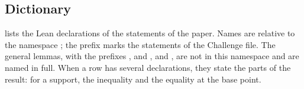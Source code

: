 \subsection{Dictionary}\label{app:formal-dictionary}

{\sloppy
{} lists the Lean declarations of the statements of the paper. Names
are relative to the namespace ; the prefix
 marks the statements of the Challenge file. The general
lemmas, with the prefixes ,  and ,
and , are not in this namespace and are named in full.
When a row has several declarations, they state the parts of the result: for a support, the
inequality and the equality at the base point.\par}

